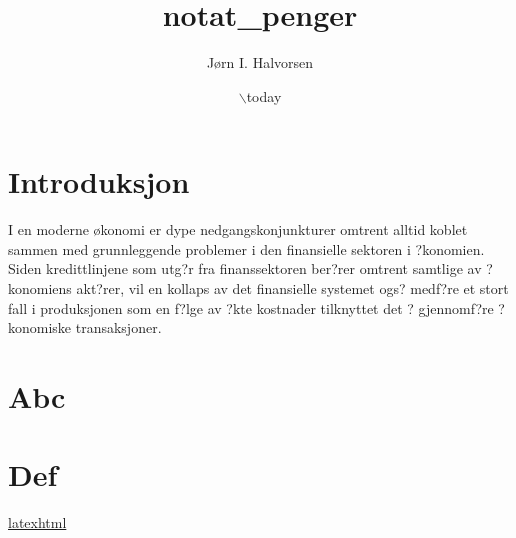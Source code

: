 \documentclass[11pt]{article}
\author{Jørn I. Halvorsen}
\date{$\backslash$today}
\title{notat\_penger}
\begin{document}
\maketitle
\tableofcontents


\section{Introduksjon}
\label{sec-1}
I en moderne økonomi er dype nedgangskonjunkturer omtrent alltid koblet sammen med grunnleggende problemer i den finansielle sektoren i ?konomien.  Siden kredittlinjene som utg?r fra finanssektoren ber?rer omtrent samtlige av ?konomiens akt?rer, vil en kollaps av det finansielle systemet ogs? medf?re et stort fall i produksjonen som en f?lge av ?kte kostnader tilknyttet det ? gjennomf?re ?konomiske transaksjoner.

\section{Abc}
\label{sec-2}

\section{Def}
\label{sec-3}





\href{http://orgmode.org/worg/org-tutorials/org-latex-export.html}{latexhtml}
\end{document}
